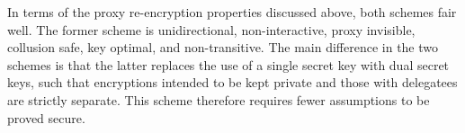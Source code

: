 In terms of the proxy re-encryption properties discussed above, both schemes fair well. The former scheme is unidirectional, non-interactive, proxy invisible, collusion safe, key optimal, and non-transitive. The main difference in the two schemes is that the latter replaces the use of a single secret key with dual secret keys, such that encryptions intended to be kept private and those with delegatees are strictly separate. This scheme therefore requires fewer assumptions to be proved secure.


\cite{lv11:2011:article}
